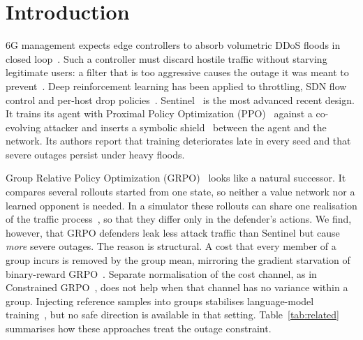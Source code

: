 \documentclass[journal]{IEEEtran}
\begin{document}
\section{Introduction}
 6G management expects edge controllers to absorb volumetric DDoS floods in closed loop~\cite{benzaid2020zsm,liyanage2023oran}. Such a controller must discard hostile traffic without starving legitimate users: a filter that is too aggressive causes the outage it was meant to prevent~\cite{guo2020xai6g}. Deep reinforcement learning has been applied to throttling, SDN flow control and per-host drop policies~\cite{malialis2015distributed,liu2018drlddos,simpson2020perhost}. Sentinel~\cite{alfatemi2026sentinel} is the most advanced recent design. It trains its agent with Proximal Policy Optimization (PPO)~\cite{schulman2017ppo} against a co-evolving attacker and inserts a symbolic shield~\cite{alshiekh2018shielding} between the agent and the network. Its authors report that training deteriorates late in every seed and that severe outages persist under heavy floods.

Group Relative Policy Optimization (GRPO)~\cite{shao2024deepseekmath} looks like a natural successor. It compares several rollouts started from one state, so neither a value network nor a learned opponent is needed. In a simulator these rollouts can share one realisation of the traffic process~\cite{ng2000pegasus}, so that they differ only in the defender's actions. We find, however, that GRPO defenders leak less attack traffic than Sentinel but cause \emph{more} severe outages. The reason is structural. A cost that every member of a group incurs is removed by the group mean, mirroring the gradient starvation of binary-reward GRPO~\cite{nie2026starvation,yu2025dapo}. Separate normalisation of the cost channel, as in Constrained GRPO~\cite{girgis2026cgrpo}, does not help when that channel has no variance within a group. Injecting reference samples into groups stabilises language-model training~\cite{yan2025luffy,armor2026}, but no safe direction is available in that setting. Table~\ref{tab:related} summarises how these approaches treat the outage constraint.
\end{document}
